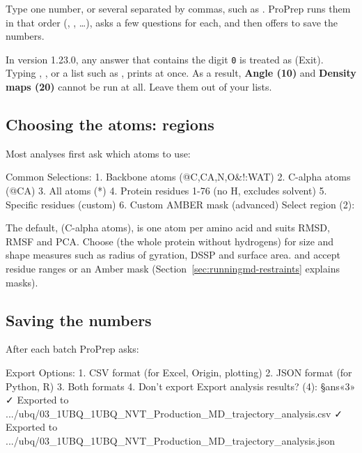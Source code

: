 Type one number, or several separated by commas, such as .
ProPrep runs them in that order (, ,
\ldots), asks a few questions for each, and then offers to save the numbers.

\begin{watchout}
In version 1.23.0, any answer that contains the digit \texttt{0} is treated
as  (Exit). Typing , , or a list such as
, prints  at
once. As a result, \textbf{Angle (10)} and \textbf{Density maps (20)} cannot
be run at all. Leave them out of your lists.
\end{watchout}

\subsection{Choosing the atoms: regions}

Most analyses first ask which atoms to use:

\begin{screen}
Common Selections:
  1. Backbone atoms (@C,CA,N,O&!:WAT)
  2. C-alpha atoms (@CA)
  3. All atoms (*)
  4. Protein residues 1-76 (no H, excludes solvent)
  5. Specific residues (custom)
  6. Custom AMBER mask (advanced)
Select region (2):
\end{screen}

The default,  (C-alpha atoms), is one atom per amino acid and suits
RMSD, RMSF and PCA. Choose  (the whole protein without hydrogens) for
size and shape measures such as radius of gyration, DSSP and surface area.
 and  accept residue ranges or an Amber mask
(Section~\ref{sec:runningmd-restraints} explains masks).

\subsection{Saving the numbers}\label{sec:analysis-export}

After each batch ProPrep asks:

\begin{screen}
Export Options:
  1. CSV format (for Excel, Origin, plotting)
  2. JSON format (for Python, R)
  3. Both formats
  4. Don't export
Export analysis results? (4): §ans«3»
✓ Exported to .../ubq/03_1UBQ_1UBQ_NVT_Production_MD_trajectory_analysis.csv
✓ Exported to .../ubq/03_1UBQ_1UBQ_NVT_Production_MD_trajectory_analysis.json
\end{screen}

